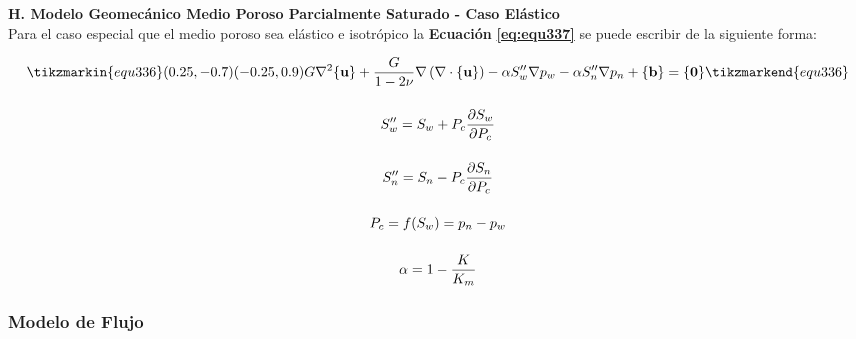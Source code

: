 \textbf{H. Modelo Geomecánico Medio Poroso Parcialmente Saturado - Caso Elástico}
\\
Para el caso especial que el medio poroso sea elástico e isotrópico la \textbf{Ecuación} \textbf{\ref{eq:equ337}} se puede escribir de la siguiente forma:\bigskip


\begin{ceqn} 
\begin{subequations} \label{eq:equ338} 
\begin{gather}
\tikzmarkin{equ336}(0.25,-0.7)(-0.25,0.9)
\normalsize{G\nabla^2 \{\mathbf{u}\}
+\frac{G}{1-2\nu} \nabla\left( \nabla\cdot \{\mathbf{u}\}\right)
- \alpha S''_w\nabla p_w - \alpha S''_n\nabla p_n + \{\mathbf{b}\} = \{\mathbf{0}\}}
\tikzmarkend{equ336}\label{eq:equ338a} \\[12pt]
S''_w = S_w + P_c\frac{\partial S_w}{\partial P_c}  \label{eq:equ338b} \\[12pt]
S''_n = S_n - P_c\frac{\partial S_n}{\partial P_c}  \label{eq:equ338c} \\[12pt]
P_c = \mathnormal{f}(S_w) = p_n - p_w  \label{eq:equ338d} \\[12pt]
\alpha=1-\frac{K}{K_m}  \label{eq:equ338e}
\end{gather}  
\end{subequations} 
\end{ceqn}


\subsubsection{Modelo de Flujo}~\hypertarget{sec:sec3322}{}
\label{sec:sec3322}

